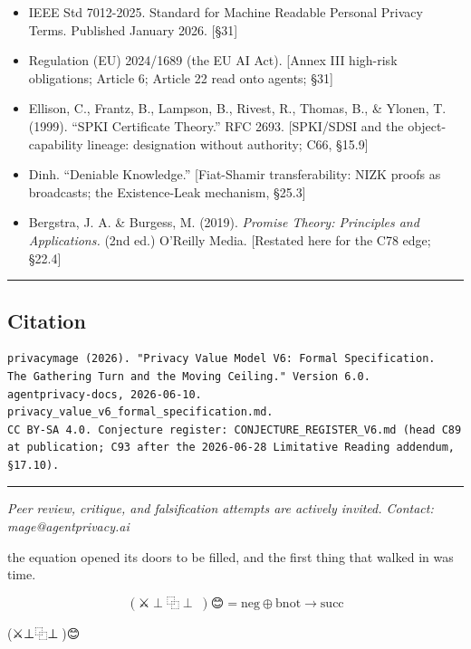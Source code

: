 \documentclass[
  11pt,
]{article}
\begin{document}
\begin{itemize}
{  Quantitative Information Flow.} Springer. {[}The Bayes-capacity bound
  (the Miracle Theorem); §10.6{]}
\item
  IEEE Std 7012-2025. Standard for Machine Readable Personal Privacy
  Terms. Published January 2026. {[}§31{]}
\item
  Regulation (EU) 2024/1689 (the EU AI Act). {[}Annex III high-risk
  obligations; Article 6; Article 22 read onto agents; §31{]}
\item
  Ellison, C., Frantz, B., Lampson, B., Rivest, R., Thomas, B., \&
  Ylonen, T. (1999). ``SPKI Certificate Theory.'' RFC 2693. {[}SPKI/SDSI
  and the object-capability lineage: designation without authority; C66,
  §15.9{]}
\item
  Dinh. ``Deniable Knowledge.'' {[}Fiat-Shamir transferability: NIZK
  proofs as broadcasts; the Existence-Leak mechanism, §25.3{]}
\item
  Bergstra, J. A. \& Burgess, M. (2019). \emph{Promise Theory:
  Principles and Applications.} (2nd ed.) O'Reilly Media. {[}Restated
  here for the C78 edge; §22.4{]}
\end{itemize}

\begin{center}\rule{0.5\linewidth}{0.5pt}\end{center}

\subsection{Citation}\label{citation}

\begin{verbatim}
privacymage (2026). "Privacy Value Model V6: Formal Specification.
The Gathering Turn and the Moving Ceiling." Version 6.0.
agentprivacy-docs, 2026-06-10. privacy_value_v6_formal_specification.md.
CC BY-SA 4.0. Conjecture register: CONJECTURE_REGISTER_V6.md (head C89 at publication; C93 after the 2026-06-28 Limitative Reading addendum, §17.10).
\end{verbatim}

\begin{center}\rule{0.5\linewidth}{0.5pt}\end{center}

\emph{Peer review, critique, and falsification attempts are actively
invited. Contact: mage@agentprivacy.ai}

the equation opened its doors to be filled, and the first thing that
walked in was time.

\[(\text{⚔️} \perp \text{⿻} \perp \text{🧙})\text{😊} = \text{neg} \oplus \text{bnot} \to \text{succ}\]

(⚔️⊥⿻⊥🧙)😊
\end{document}
